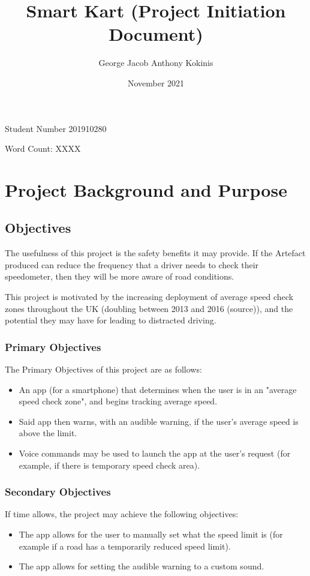\documentclass[11pt, a4paper, notitlepage]{report}
\title{Smart Kart (Project Initiation Document)}
\date{November 2021}
\author{George Jacob Anthony Kokinis}
\begin{document}
\maketitle
\begin{center}
    Student Number 201910280
    
    Word Count: XXXX %
\end{center}
\newpage

\tableofcontents

\chapter{Project Background and Purpose}
\section{Objectives}
The usefulness of this project is the safety benefits it may provide. If the 
Artefact produced can reduce the frequency that a driver needs to check their 
speedometer, then they will be more aware of road conditions.

This project is motivated by the increasing deployment of average speed check 
zones throughout the UK (doubling between 2013 and 2016 (source)), and the 
potential they may have for leading to distracted driving.

\subsection{Primary Objectives}\label{subsec:PrimaryObjectives}
The Primary Objectives of this project are as follows:
\begin{itemize}
    \item An app (for a smartphone) that determines when the user is in an 
    "average speed check zone", and begins tracking average speed.
    \item Said app then warns, with an audible warning, if the user's average 
    speed is above the limit.
    \item Voice commands may be used to launch the app at the user's request 
    (for example, if there is temporary speed check area).
\end{itemize}

\subsection{Secondary Objectives}
If time allows, the project may achieve the following objectives:
\begin{itemize}
    \item The app allows for the user to manually set what the speed limit is 
    (for example if a road has a temporarily reduced speed limit).
    \item The app allows for setting the audible warning to a custom sound.
\end{itemize}
\end{document}
